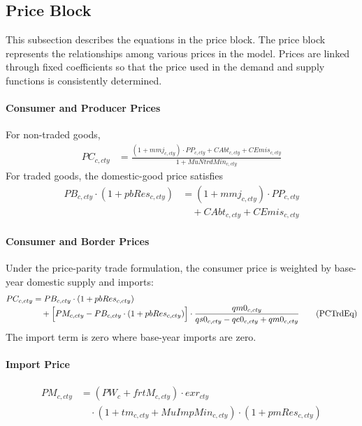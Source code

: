 \subsection{Price Block}

This subsection describes the equations in the price block.  
The price block represents the relationships among various prices in the model.  
Prices are linked through fixed coefficients so that the price used in the demand and supply functions is consistently determined.

\paragraph{Consumer and Producer Prices}
For non-traded goods,
\begin{align}
  PC_{c,cty}
  &= \frac{(1+mmj_{c,cty})\cdot PP_{c,cty}
       + CAbt_{c,cty}+CEmis_{c,cty}}
       {1+MuNtrdMin_{c,cty}}
  \tag{PCNtrdEq}\label{eq:PCNtrdEq}
\end{align}
For traded goods, the domestic-good price satisfies
\begin{align}
  PB_{c,cty}\cdot(1+pbRes_{c,cty})
  &= (1+mmj_{c,cty})\cdot PP_{c,cty}
     \nonumber\\[-0.3em]
  &\quad + CAbt_{c,cty}+CEmis_{c,cty}
  \tag{PBEq}\label{eq:PBEq}
\end{align}

\paragraph{Consumer and Border Prices}
Under the price-parity trade formulation, the consumer price is weighted by base-year domestic supply and imports:
\begin{align}
  PC_{c,cty}
  &= PB_{c,cty}\cdot(1+pbRes_{c,cty})
     \nonumber\\[-0.3em]
  &\quad + \Bigl[PM_{c,cty}-PB_{c,cty}\cdot(1+pbRes_{c,cty})\Bigr]
       \cdot\frac{qm0_{c,cty}}
       {qs0_{c,cty}-qe0_{c,cty}+qm0_{c,cty}}
  \tag{PCTrdEq}\label{eq:PCTrdEq}
\end{align}
The import term is zero where base-year imports are zero.

\paragraph{Import Price}
\begin{align}
  PM_{c,cty}
  &= (PW_c+frtM_{c,cty})\cdot exr_{cty}
     \nonumber\\[-0.3em]
  &\quad \cdot (1+tm_{c,cty}+MuImpMin_{c,cty})
     \cdot (1+pmRes_{c,cty})
  \tag{PMEq}\label{eq:PMEq}
\end{align}

